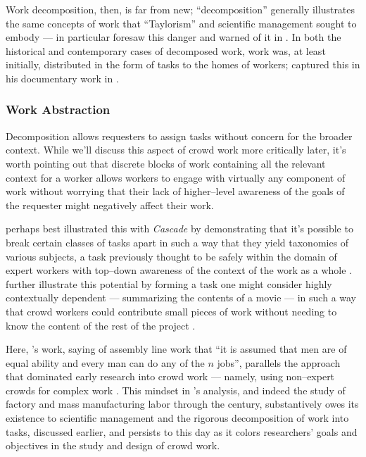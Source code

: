 \documentclass{sigchi}
\begin{document}
Work decomposition, then, is far from new;
``decomposition'' generally illustrates the same concepts of work that ``Taylorism''
and scientific management sought to embody
---
\citeauthor{silberman2010ethics} in particular foresaw this danger and warned of it in
\citeyear{silberman2010ethics}
\cite{crowdworkFuture,silberman2010ethics,nickerson2013crowd}.
In both the historical and contemporary cases of decomposed work,
work was,
at least initially,
distributed in the form of tasks to the homes of workers;
\citeauthor{riisOtherSideLives} captured this in his documentary work
in \citeyear{riisOtherSideLives}
\cite{riisOtherSideLives}.



\subsubsection{Work Abstraction}\label{sec:workAbstraction}
Decomposition allows requesters to assign tasks without concern for the broader context.
While we'll discuss this aspect of crowd work more critically later,
it's worth pointing out that discrete blocks of work containing all the relevant context for a worker
allows workers to engage with virtually any component of work without worrying that their lack of 
higher--level awareness of the goals of the requester might negatively affect their work.

\citeauthor{chilton2013cascade} perhaps best illustrated this with
\textit{Cascade} by demonstrating that it's possible to
break certain classes of tasks apart
in such a way that they yield taxonomies of various subjects,
a task previously thought to be safely within the domain of expert workers
with top--down awareness of the context of the work as a whole
\cite{chilton2013cascade}.
\citeauthor{verroios2014context} further illustrate this potential by
forming a task one might consider highly contextually dependent
--- summarizing the contents of a movie ---
in such a way that crowd workers could contribute small pieces of work without
needing to know the content of the rest of the project
\cite{verroios2014context}.

Here, \citeauthor{hu1961parallel}'s work,
saying of assembly line work that
``it is assumed that men are of equal ability and every man can do any of the $n$ jobs'',
parallels the approach that dominated early research into crowd work
--- namely, using non--expert crowds for complex work
\cite{hu1961parallel}.
This mindset in \citeauthor{hu1961parallel}'s analysis,
and indeed the study of factory and mass manufacturing labor through the  century,
substantively owes its existence to scientific management
and the rigorous decomposition of work into tasks, discussed earlier,
and persists to this day as it colors
researchers' goals and objectives in the study and design of crowd work.
\end{document}
